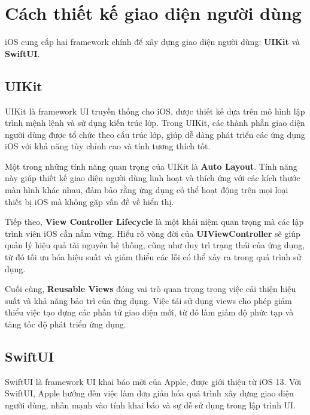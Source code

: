 \section{Cách thiết kế giao diện người dùng}
iOS cung cấp hai framework chính để xây dựng giao diện người dùng: \textbf{UIKit} và \textbf{SwiftUI}.

\subsection{UIKit}
UIKit là framework UI truyền thống cho iOS, được thiết kế dựa trên mô hình lập trình mệnh lệnh và sử dụng kiến trúc lớp. Trong UIKit, các thành phần giao diện người dùng được tổ chức theo cấu trúc lớp, giúp dễ dàng phát triển các ứng dụng iOS với khả năng tùy chỉnh cao và tính tương thích tốt.

\vspace{0.5em}

Một trong những tính năng quan trọng của UIKit là \textbf{Auto Layout}. Tính năng này giúp thiết kế giao diện người dùng linh hoạt và thích ứng với các kích thước màn hình khác nhau, đảm bảo rằng ứng dụng có thể hoạt động trên mọi loại thiết bị iOS mà không gặp vấn đề về hiển thị.

\vspace{0.5em}

Tiếp theo, \textbf{View Controller Lifecycle} là một khái niệm quan trọng mà các lập trình viên iOS cần nắm vững. Hiểu rõ vòng đời của \textbf{UIViewController} sẽ giúp quản lý hiệu quả tài nguyên hệ thống, cũng như duy trì trạng thái của ứng dụng, từ đó tối ưu hóa hiệu suất và giảm thiểu các lỗi có thể xảy ra trong quá trình sử dụng.

\vspace{0.5em}

Cuối cùng, \textbf{Reusable Views} đóng vai trò quan trọng trong việc cải thiện hiệu suất và khả năng bảo trì của ứng dụng. Việc tái sử dụng views cho phép giảm thiểu việc tạo dựng các phần tử giao diện mới, từ đó làm giảm độ phức tạp và tăng tốc độ phát triển ứng dụng.

\subsection{SwiftUI}
SwiftUI \cite{swiftui} là framework UI khai báo mới của Apple, được giới thiệu từ iOS 13. Với SwiftUI, Apple hướng đến việc làm đơn giản hóa quá trình xây dựng giao diện người dùng, nhấn mạnh vào tính khai báo và sự dễ sử dụng trong lập trình UI.

